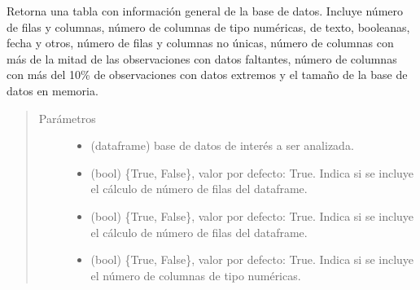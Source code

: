 \documentclass[letterpaper,10pt,openany,spanish]{sphinxmanual}
\begin{document}
\begin{fulllineitems}
\label{\detokenize{datos:datos.resumen_base}}
Retorna una tabla con información general de la base de datos.
Incluye número de filas y columnas, número de columnas de tipo numéricas, de texto, booleanas, fecha y otros,
número de filas y columnas no únicas, número de columnas con más de la mitad de las observaciones con datos faltantes,
número de columnas con más del 10\% de observaciones con datos extremos y el tamaño de la base de datos en memoria.
\begin{quote}\begin{description}
\item[{Parámetros}] \leavevmode\begin{itemize}
\item {} 
 \textendash{} (dataframe) base de datos de interés a ser analizada.

\item {} 
 \textendash{} (bool) \{True, False\}, valor por defecto: True. Indica si se incluye el cálculo de número de filas del dataframe.

\item {} 
 \textendash{} (bool) \{True, False\}, valor por defecto: True. Indica si se incluye el cálculo de número de filas del dataframe.

\item {} 
 \textendash{} (bool) \{True, False\}, valor por defecto: True. Indica si se incluye el número de columnas de tipo numéricas.


\end{itemize}
\end{description}
\end{quote}
\end{fulllineitems}
\end{document}
